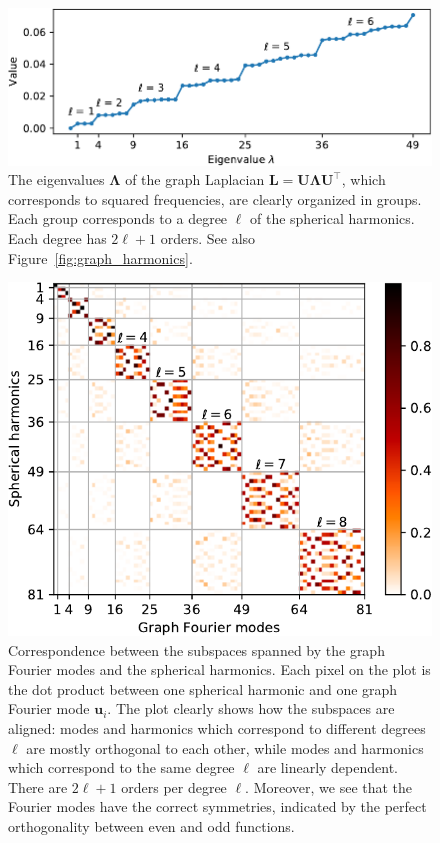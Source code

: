 \documentclass[final,twocolumn,3p,times,sort&compress]{elsarticle}
\newcommand{\figref}[1]{Figure~\ref{fig:#1}}
\renewcommand{\b}[1]{{\bm{#1}}}   %
\newcommand{\1}{\b{1}}              %
\newcommand{\0}{\b{0}}              %
\renewcommand{\L}{\b{L}}
\newcommand{\U}{\b{U}}
\newcommand{\trans}{^\intercal}
\newcommand{\bLambda}{\b{\Lambda}}
\begin{document}
\begin{figure}
	\centering
	\includegraphics[width=\linewidth]{graph_eigenvalues}
	\caption{The eigenvalues $\bLambda$ of the graph Laplacian $\L = \U \bLambda \U\trans$, which corresponds to squared frequencies, are clearly organized in groups. Each group corresponds to a degree $\ell$ of the spherical harmonics. Each degree has $2\ell + 1$ orders. See also \figref{graph_harmonics}.}
	\label{fig:graph_eigenvalues}
\end{figure}

\begin{figure}
	\centering
	\includegraphics[width=\linewidth]{subspace_harmonics_eigenvectors}
	\caption{Correspondence between the subspaces spanned by the graph Fourier modes and the spherical harmonics. Each pixel on the plot is the dot product between one spherical harmonic and one graph Fourier mode $\b u_i$. The plot clearly shows how the subspaces are aligned: modes and harmonics which correspond to different degrees $\ell$ are mostly orthogonal to each other, while modes and harmonics which correspond to the same degree $\ell$ are linearly dependent. There are $2 \ell + 1$ orders per degree $\ell$. Moreover, we see that the Fourier modes have the correct symmetries, indicated by the perfect orthogonality between even and odd functions.}
	\label{fig:subspace_harmonics_eigenvectors}
\end{figure}
\end{document}
